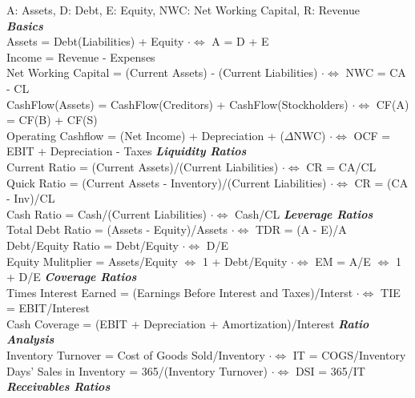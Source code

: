 \documentclass{letter}
\newcommand{\textib}[1]{\textit{\textbf{{#1}}}}
\begin{document}
A: Assets, D: Debt, E: Equity, NWC: Net Working Capital, R: Revenue \\
\textib{Basics} \\
Assets = Debt(Liabilities) + Equity \leaders\hbox{$\cdot$}\hfill $\iff$ A = D + E \\
Income = Revenue - Expenses \\
Net Working Capital = (Current Assets) - (Current Liabilities) \leaders\hbox{$\cdot$}\hfill $\iff$ NWC = CA - CL \\
CashFlow(Assets) = CashFlow(Creditors) + CashFlow(Stockholders) \leaders\hbox{$\cdot$}\hfill $\iff$ CF(A) = CF(B) + CF(S) \\
Operating Cashflow = (Net Income) + Depreciation + ($\Delta$NWC) \leaders\hbox{$\cdot$}\hfill $\iff$ OCF = EBIT + Depreciation - Taxes
\newline
\textib{Liquidity Ratios} \\
Current Ratio = (Current Assets)/(Current Liabilities) \leaders\hbox{$\cdot$}\hfill $\iff$ CR = CA/CL \\
Quick Ratio = (Current Assets - Inventory)/(Current Liabilities) \leaders\hbox{$\cdot$}\hfill $\iff$ CR = (CA - Inv)/CL \\
Cash Ratio = Cash/(Current Liabilities) \leaders\hbox{$\cdot$}\hfill $\iff$ Cash/CL
\newline
\textib{Leverage Ratios} \\
Total Debt Ratio = (Assets - Equity)/Assets \leaders\hbox{$\cdot$}\hfill $\iff$ TDR = (A - E)/A \\
Debt/Equity Ratio = Debt/Equity \leaders\hbox{$\cdot$}\hfill $\iff$ D/E \\
Equity Mulitplier = Assets/Equity $\iff$ 1 + Debt/Equity \leaders\hbox{$\cdot$}\hfill $\iff$ EM = A/E $\iff$ 1 + D/E
\newline
\textib{Coverage Ratios} \\
Times Interest Earned = (Earnings Before Interest and Taxes)/Interst \leaders\hbox{$\cdot$}\hfill $\iff$ TIE = EBIT/Interest \\
Cash Coverage = (EBIT + Depreciation + Amortization)/Interest
\newline
\textib{Ratio Analysis} \\
Inventory Turnover = Cost of Goods Sold/Inventory \leaders\hbox{$\cdot$}\hfill $\iff$ IT = COGS/Inventory \\
Days' Sales in Inventory = 365/(Inventory Turnover) \leaders\hbox{$\cdot$}\hfill $\iff$ DSI = 365/IT
\newline
\textib{Receivables Ratios} \\
\end{document}
